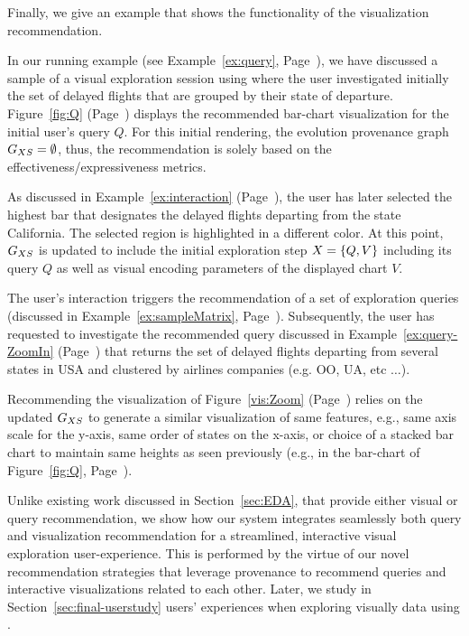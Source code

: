Finally, we give an example that shows the functionality of the visualization recommendation.
\begin{example}
In our running example (see Example~\ref{ex:query}, Page~\pageref{ex:query}), we have discussed a sample of a visual exploration session using \prototype{} where the user investigated initially the set of delayed flights that are grouped by their state of departure.
Figure~\ref{fig:Q} (Page~\pageref{fig:Q}) displays the recommended bar-chart visualization for the initial user's query $Q$. For this initial rendering, the evolution provenance graph $G_{XS} = \emptyset$, thus, the recommendation is solely based on the effectiveness/expressiveness metrics. 


As discussed in Example~\ref{ex:interaction} (Page~\pageref{ex:interaction}), the user has later selected the highest bar that designates the delayed flights departing from the state California. The selected region is highlighted in a different color. At this point, $G_{XS}$ is updated to include the initial exploration step $X=\{Q,V\}$ including its query $Q$ as well as visual encoding parameters of the displayed chart $V$.

The user's interaction triggers the recommendation of a set of exploration queries (discussed in Example~\ref{ex:sampleMatrix}, Page~\pageref{ex:sampleMatrix}).
Subsequently, the user has requested to investigate the recommended query discussed in Example~\ref{ex:query-ZoomIn} (Page~\pageref{ex:query-ZoomIn}) that returns the set of delayed flights departing from several states in USA and clustered by airlines companies (e.g. OO, UA, etc $\ldots$).

Recommending the visualization of Figure~\ref{vis:Zoom} (Page~\pageref{vis:Zoom}) relies on the updated $G_{XS}$ to generate a similar visualization of same features, e.g., same axis scale for the y-axis, same order of states on the x-axis, or choice of a stacked bar chart to maintain same heights as seen previously (e.g., in the bar-chart of Figure~\ref{fig:Q}, Page~\pageref{fig:Q}).
\end{example}



 
Unlike existing work discussed in Section~\ref{sec:EDA}, that provide either visual or query recommendation, we show how our system \prototype{} integrates seamlessly both query and visualization recommendation for a streamlined, interactive visual exploration user-experience. This is performed by the virtue of our novel recommendation strategies that leverage provenance to recommend queries and interactive visualizations related to each other.  Later, we study in Section~\ref{sec:final-userstudy} users' experiences when exploring visually data using \prototype{}.



